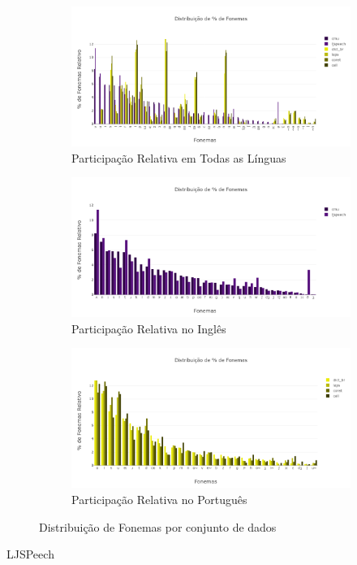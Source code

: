\begin{figure}
    \centering
    \begin{subfigure}[c]{\textwidth}
        \centering
        \vspace{-40pt}
        \includegraphics[width=\textwidth]{figuras/bar_all_phonemes.png}
        \caption{Participação Relativa em Todas as Línguas}
    \end{subfigure}
    \begin{subfigure}[c]{\textwidth}
        \centering
        \includegraphics[width=\textwidth]{figuras/bar_en_phonemes.png}
        \caption{Participação Relativa no Inglês}
    \end{subfigure}
    \begin{subfigure}[c]{\textwidth}
        \centering
        \includegraphics[width=\textwidth]{figuras/bar_pt_phonemes.png}
        \vspace{-20pt}
        \caption{Participação Relativa no Português}
    \end{subfigure}
    \caption{Distribuição de Fonemas por conjunto de dados}
    \label{fig:fonemas_analysis}
\end{figure}
LJSPeech

